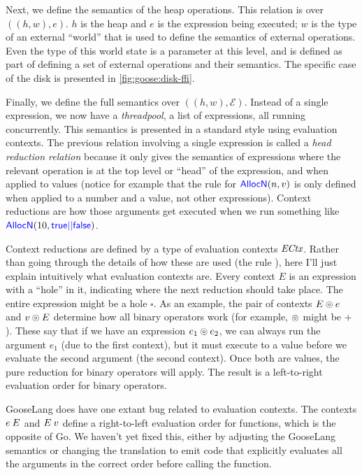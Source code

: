Next, we define the semantics of the heap operations. This relation is over
$((h, w), e)$. $h$ is the heap and $e$ is the expression being executed; $w$ is
the type of an external ``world'' that is used to define the semantics of
external operations. Even the type of this world state is a parameter at this
level, and is defined as part of defining a set of external operations and their
semantics. The specific case of the disk is presented in
\autoref{fig:goose:disk-ffi}.

Finally, we define the full semantics over $((h, w), \mathcal{E})$. Instead of a
single expression, we now have a \emph{threadpool}, a list of expressions, all
running concurrently. This semantics is presented in a standard style using
evaluation contexts. The previous relation involving a single expression
is called a \emph{head reduction relation} because it only gives the semantics
of expressions where the relevant operation is at the top level or ``head'' of
the expression, and when applied to values (notice for example that the rule for
$\mathsf{\textcolor{blue}{AllocN}}(n, v)$ is only defined when applied to a number and a value,
not other expressions). Context reductions are how those arguments get executed
when we run something like $\mathsf{\textcolor{blue}{AllocN}}(10, \mathsf{\textcolor{blue}{true || false}})$.

Context reductions are defined by a type of evaluation contexts
$\textit{ECtx}$. Rather than going through the details of how these are used
(the rule ), here I'll just explain intuitively what
evaluation contexts are. Every context $E$ is an expression with a ``hole'' in
it, indicating where the next reduction should take place. The entire expression
might be a hole $\square$. As an example, the pair of contexts $E \circledcirc e$ and
$v \circledcirc E$ determine how all binary operators work (for example, $\circledcirc$
might be $+$). These say that if we have an expression $e_{1} \circledcirc e_{2}$, we can
always run the argument $e_{1}$ (due to the first context), but it must execute
to a value before we evaluate the second argument (the second context). Once
both are values, the pure reduction for binary operators will apply. The result
is a left-to-right evaluation order for binary operators.

GooseLang does have one extant bug related to evaluation contexts. The contexts
$e \: E$ and $E \: v$ define a right-to-left evaluation order for functions,
which is the opposite of Go. We haven't yet fixed this, either by adjusting the
GooseLang semantics or changing the translation to emit code that explicitly
evaluates all the arguments in the correct order before calling the function.

